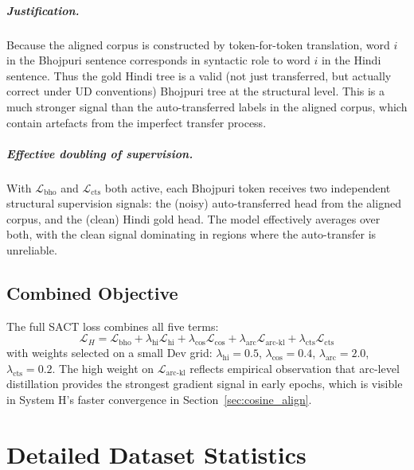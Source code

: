 \documentclass[12pt,a4paper,oneside]{report}
\begin{document}
\paragraph{Justification.}
Because the aligned corpus is constructed by token-for-token translation, word
$i$ in the Bhojpuri sentence corresponds in syntactic role to word $i$ in the
Hindi sentence. Thus the gold Hindi tree is a valid (not just transferred,
but actually correct under UD conventions) Bhojpuri tree at the structural
level. This is a much stronger signal than the auto-transferred labels in the
aligned corpus, which contain artefacts from the imperfect transfer process.

\paragraph{Effective doubling of supervision.}
With $\mathcal{L}_{\text{bho}}$ and $\mathcal{L}_{\text{cts}}$ both active,
each Bhojpuri token receives two independent structural supervision signals:
the (noisy) auto-transferred head from the aligned corpus, and the (clean)
Hindi gold head. The model effectively averages over both, with the clean
signal dominating in regions where the auto-transfer is unreliable.

\section{Combined Objective}

The full SACT loss combines all five terms:
\begin{equation}
  \mathcal{L}_H = \mathcal{L}_{\text{bho}}
                  + \lambda_{\text{hi}} \mathcal{L}_{\text{hi}}
                  + \lambda_{\text{cos}} \mathcal{L}_{\text{cos}}
                  + \lambda_{\text{arc}} \mathcal{L}_{\text{arc-kl}}
                  + \lambda_{\text{cts}} \mathcal{L}_{\text{cts}}
\end{equation}
with weights selected on a small Dev grid:
$\lambda_{\text{hi}}{=}0.5$, $\lambda_{\text{cos}}{=}0.4$,
$\lambda_{\text{arc}}{=}2.0$, $\lambda_{\text{cts}}{=}0.2$. The high weight on
$\mathcal{L}_{\text{arc-kl}}$ reflects empirical observation that arc-level
distillation provides the strongest gradient signal in early epochs, which is
visible in System H's faster convergence in Section~\ref{sec:cosine_align}.


\chapter{Detailed Dataset Statistics}
\label{app:datastats}
\end{document}
